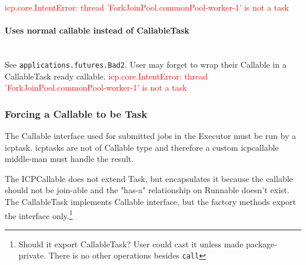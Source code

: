 \textcolor{red}{icp.core.IntentError: thread 'ForkJoinPool.commonPool-worker-1' is not a task}

\paragraph*{Uses normal callable instead of CallableTask}~\\
See \lstinline{applications.futures.Bad2}. User may forget to wrap their Callable in a
CallableTask ready callable.
\textcolor{red}{icp.core.IntentError: thread 'ForkJoinPool.commonPool-worker-1' is not a task}

\subsubsection*{Forcing a Callable to be Task}


The Callable interface used for submitted jobs in the Executor must be run by a \gls{icptask}. \gls{icptask}s
are not of Callable type and therefore a custom \gls{icpcallable} middle-man must handle the result.

The ICPCallable does not extend Task, but encapsulates it because the callable should not be join-able and the
"has-a" relationship on Runnable doesn't exist. The CallableTask implements Callable interface,
but the factory methods export the interface only.\footnote{Should it export
CallableTask? User could cast it unless made package-private. There is no other operations besides \lstinline{call}}

